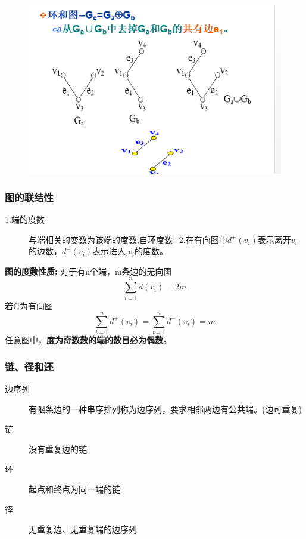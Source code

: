 \begin{description}
\begin{figure}[H]
		\centering
		\includegraphics[width=0.7\linewidth]{figures/screenshot042}
		\caption{}
		\label{fig:screenshot042}
	\end{figure}
\end{description}
\subsubsection{图的联结性}
\begin{description}
	\item[1.端的度数] 与端相关的变数为该端的度数,自环度数+2.在有向图中$ d^+(v_i) $表示离开$ v_i $的边数，$ d^-(v_i) $表示进入,$ v_i $的度数。
\end{description}
\textbf{图的度数性质:}
对于有n个端，m条边的无向图
\begin{equation}\label{key}
\sum_{i=1}^{n}d(v_i) = 2m
\end{equation}
若G为有向图
\begin{equation}\label{key}
\sum_{i=1}^{n}d^+(v_i) = \sum_{i=1}^{n}d^-(v_i) = m
\end{equation}
任意图中，\textbf{度为奇数数的端的数目必为偶数}。
\subsubsection{链、径和还}
\begin{description}
	\item[边序列] 有限条边的一种串序排列称为边序列，要求相邻两边有公共端。(边可重复)
	\item [链] 没有重复边的链
	\item [环] 起点和终点为同一端的链
	\item[径] 无重复边、无重复端的边序列
\end{description}
